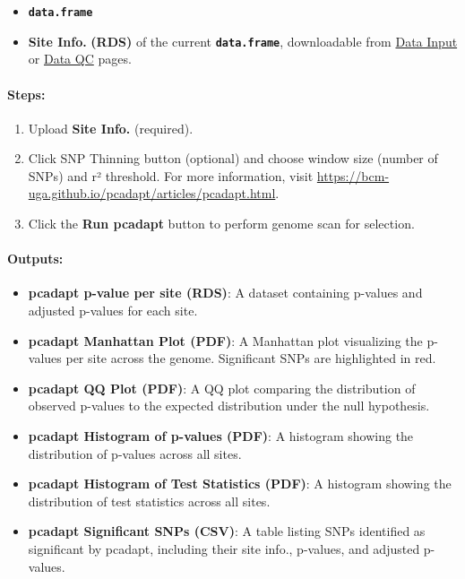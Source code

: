 \documentclass[
]{book}
\providecommand{\tightlist}{%
  \setlength{\itemsep}{0pt}\setlength{\parskip}{0pt}}
\begin{document}
\begin{itemize}
\tightlist
\item
  {\textbf{\texttt{data.frame}}}
\item
  \textbf{Site Info.} \textbf{(RDS)} of the current {\textbf{\texttt{data.frame}}}, downloadable from \ul{Data Input} or \ul{Data QC} pages.
\end{itemize}

\paragraph*{\texorpdfstring{\textbf{Steps:}}{Steps:}}\label{steps-7}

\begin{enumerate}
\def\labelenumi{\arabic{enumi}.}
\item
  {Upload} \textbf{Site Info.} (required).
\item
  Click {SNP Thinning} button (optional) and choose window size (number of SNPs) and r² threshold. For more information, visit \url{https://bcm-uga.github.io/pcadapt/articles/pcadapt.html}.
\item
  Click the {\textbf{Run pcadapt}} button to perform genome scan for selection.
\end{enumerate}

\paragraph*{Outputs:}\label{outputs-16}

\begin{itemize}
\item
  \textbf{pcadapt p-value per site (RDS)}: A dataset containing p-values and adjusted p-values for each site.
\item
  \textbf{pcadapt Manhattan Plot (PDF)}: A Manhattan plot visualizing the p-values per site across the genome. Significant SNPs are highlighted in red.
\item
  \textbf{pcadapt QQ Plot (PDF)}: A QQ plot comparing the distribution of observed p-values to the expected distribution under the null hypothesis.
\item
  \textbf{pcadapt Histogram of p-values (PDF)}: A histogram showing the distribution of p-values across all sites.
\item
  \textbf{pcadapt Histogram of Test Statistics (PDF)}: A histogram showing the distribution of test statistics across all sites.
\item
  \textbf{pcadapt Significant SNPs (CSV)}: A table listing SNPs identified as significant by pcadapt, including their site info., p-values, and adjusted p-values.
\end{itemize}
\end{document}

